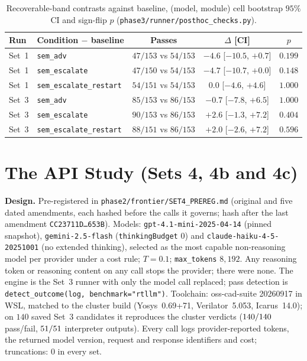 \documentclass[11pt]{article}
\newcommand{\cond}[1]{\texttt{#1}}
\begin{document}
\begin{table}[htbp]
\centering
\caption{Recoverable-band contrasts against baseline, (model, module) cell
bootstrap $95\%$ CI and sign-flip $p$ (\texttt{phase3/runner/posthoc\_checks.py}).}
\label{tab:s-posthoc}
\small
\begin{tabular}{@{}l l c c c@{}}
\toprule
\textbf{Run} & \textbf{Condition $-$ baseline} & \textbf{Passes} & \textbf{$\Delta$ [CI]} & \textbf{$p$} \\
\midrule
Set~1 & \cond{sem\_adv}              & $47/153$ vs $54/153$ & $-4.6$ [$-10.5$, $+0.7$] & $0.199$ \\
Set~1 & \cond{sem\_escalate}         & $47/150$ vs $54/153$ & $-4.7$ [$-10.7$, $+0.0$] & $0.148$ \\
Set~1 & \cond{sem\_escalate\_restart} & $54/151$ vs $54/153$ & $0.0$ [$-4.6$, $+4.6$]  & $1.000$ \\
Set~3 & \cond{sem\_adv}              & $85/153$ vs $86/153$ & $-0.7$ [$-7.8$, $+6.5$]  & $1.000$ \\
Set~3 & \cond{sem\_escalate}         & $90/153$ vs $86/153$ & $+2.6$ [$-1.3$, $+7.2$]  & $0.404$ \\
Set~3 & \cond{sem\_escalate\_restart} & $88/151$ vs $86/153$ & $+2.0$ [$-2.6$, $+7.2$]  & $0.596$ \\
\bottomrule
\end{tabular}
\end{table}

\section{The API Study (Sets 4, 4b and 4c)}
\label{s:api}

\textbf{Design.} Pre-registered in \texttt{phase2/frontier/SET4\_PREREG.md}
(original and five dated amendments, each hashed before the calls it governs;
hash after the last amendment \texttt{CC23711D\ldots653B}). Models:
\texttt{gpt-4.1-mini-2025-04-14} (pinned snapshot),
\texttt{gemini-2.5-flash} (\texttt{thinkingBudget} $0$) and
\texttt{claude-haiku-4-5-20251001} (no extended thinking), selected as the most
capable non-reasoning model per provider under a cost rule; $T{=}0.1$;
\texttt{max\_tokens} $8{,}192$. Any reasoning token or reasoning content on any
call stops the provider; there were none. The engine is the Set~3 runner with
only the model call replaced; pass detection is
\texttt{detect\_outcome(log, benchmark="rtllm")}. Toolchain: oss-cad-suite
20260917 in WSL, matched to the cluster build (Yosys~0.69+71, Verilator~5.053,
Icarus~14.0); on $140$ saved Set~3 candidates it reproduces the cluster verdicts
($140/140$ pass/fail, $51/51$ interpreter outputs).
Every call logs provider-reported tokens, the returned model version, request
and response identifiers and cost; truncations: $0$ in every set.
\end{document}
